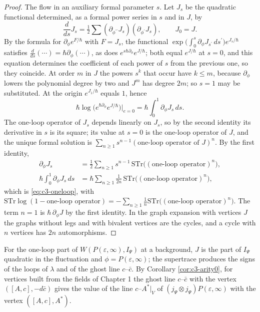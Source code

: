\begin{proof}
The flow in an auxiliary formal parameter $s$. Let $J_s$ be the quadratic functional determined, as a formal power series in $s$ and in $J$, by
\[
\frac{d}{ds}J_s=\tfrac12\sum(\partial_{\phi^{\prime\prime}}J_s)(\partial_{\phi^{\prime}}J_s),\qquad J_0=J .
\]
By the formula for $\partial_\phi e^{F/\hbar}$ with $F=J_s$, the functional $\exp\big(\int_0^s\partial_\phi J_{s^{\prime}}\,ds^{\prime}\big)e^{J_s/\hbar}$ satisfies $\frac{d}{ds}(\cdots)=\hbar\partial_\phi(\cdots)$, as does $e^{s\hbar\partial_\phi}e^{J/\hbar}$; both equal $e^{J/\hbar}$ at $s=0$, and this equation determines the coefficient of each power of $s$ from the previous one, so they coincide. At order $m$ in $J$ the powers $s^k$ that occur have $k\le m$, because $\partial_\phi$ lowers the polynomial degree by two and $J^m$ has degree $2m$; so $s=1$ may be substituted. At the origin $e^{J_1/\hbar}$ equals $1$, hence
\[
\hbar\log\big(e^{\hbar\partial_\phi}e^{J/\hbar}\big)\Big|_{e=0}=\hbar\int_0^1\partial_\phi J_s\,ds .
\]
The one-loop operator of $J_s$ depends linearly on $J_s$, so by the second identity its derivative in $s$ is its square; its value at $s=0$ is the one-loop operator of $J$, and the unique formal solution is $\sum_{n\ge1}s^{n-1}(\text{one-loop operator of }J)^n$. By the first identity,
\[
\begin{aligned}
\partial_\phi J_s&=\tfrac12\sum_{n\ge1}s^{n-1}\,\mathrm{STr}\big((\text{one-loop operator})^n\big),\\
\hbar\int_0^1\partial_\phi J_s\,ds&=\hbar\sum_{n\ge1}\frac1{2n}\,\mathrm{STr}\big((\text{one-loop operator})^n\big),
\end{aligned}
\]
which is \eqref{eq:c3-oneloop}, with $\mathrm{STr}\log(1-\text{one-loop operator})=-\sum_{n\ge1}\frac1n\mathrm{STr}\big((\text{one-loop operator})^n\big)$. The term $n=1$ is $\hbar\,\partial_\phi J$ by the first identity. In the graph expansion with vertices $J$ the graphs without legs and with bivalent vertices are the cycles, and a cycle with $n$ vertices has $2n$ automorphisms.
\end{proof}

\begin{remark}
\label{rem:c3-oneloop}
For the one-loop part of $W(P(\varepsilon,\infty),I_\Psi)$ at a background, $J$ is the part of $I_\Psi$ quadratic in the fluctuation and $\phi=P(\varepsilon,\infty)$; the supertrace produces the signs of the loops of $\lambda$ and of the ghost line $c$--$\bar c$. By Corollary \ref{cor:c3-arity0}, for vertices built from the fields of Chapter 1 the ghost line $c$--$\bar c$ with the vertex $([A,c],-d\bar c)$ gives the value of the line $c$--$A^*|_V$ of $(j_\Psi\otimes j_\Psi)P(\varepsilon,\infty)$ with the vertex $([A,c],A^*)$.
\end{remark}

